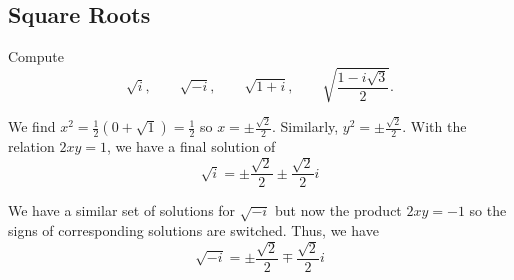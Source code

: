\documentclass[../../master.tex]{subfiles}
\begin{document}
\subsection{Square Roots}

\begin{problem}
    Compute
    \[
        \sqrt{i}, \qquad \sqrt{-i}, \qquad \sqrt{1 + i}, \qquad \sqrt{\frac{1 - i\sqrt{3}}{2}}.
    \]
\end{problem}

\begin{solution}
    We find $x^2 = \frac{1}{2} (0 + \sqrt{1}) = \frac{1}{2}$ so $x = \pm \frac{\sqrt{2}}{2}$. 
    Similarly, $y^2 = \pm \frac{\sqrt{2}}{2}$.
    With the relation $2xy = 1$, we have a final solution of
    \[
        \sqrt{i} = \pm \frac{\sqrt{2}}{2} \pm \frac{\sqrt{2}}{2} i
    \]
    
    We have a similar set of solutions for $\sqrt{-i}$ but now the product $2xy = -1$ so the signs of corresponding solutions are switched. Thus, we have
    \[
        \sqrt{-i} = \pm \frac{\sqrt{2}}{2} \mp \frac{\sqrt{2}}{2} i
    \]
\end{solution}
\end{document}
